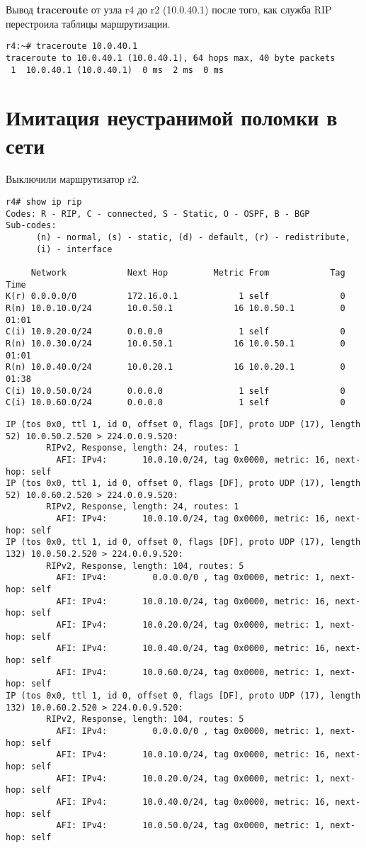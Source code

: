 \documentclass[a4paper,12pt]{article}
\begin{document}
Вывод \textbf{traceroute} от узла r4 до r2 (10.0.40.1) после того, как служба RIP перестроила таблицы маршрутизации.

\begin{Verbatim}
r4:~# traceroute 10.0.40.1
traceroute to 10.0.40.1 (10.0.40.1), 64 hops max, 40 byte packets
 1  10.0.40.1 (10.0.40.1)  0 ms  2 ms  0 ms
\end{Verbatim}

\section{Имитация неустранимой поломки в сети}

Выключили маршрутизатор r2.
\begin{Verbatim}
r4# show ip rip
Codes: R - RIP, C - connected, S - Static, O - OSPF, B - BGP
Sub-codes:
      (n) - normal, (s) - static, (d) - default, (r) - redistribute,
      (i) - interface

     Network            Next Hop         Metric From            Tag Time
K(r) 0.0.0.0/0          172.16.0.1            1 self              0
R(n) 10.0.10.0/24       10.0.50.1            16 10.0.50.1         0 01:01
C(i) 10.0.20.0/24       0.0.0.0               1 self              0
R(n) 10.0.30.0/24       10.0.50.1            16 10.0.50.1         0 01:01
R(n) 10.0.40.0/24       10.0.20.1            16 10.0.20.1         0 01:38
C(i) 10.0.50.0/24       0.0.0.0               1 self              0
C(i) 10.0.60.0/24       0.0.0.0               1 self              0
\end{Verbatim}

\begin{Verbatim}
IP (tos 0x0, ttl 1, id 0, offset 0, flags [DF], proto UDP (17), length 52) 10.0.50.2.520 > 224.0.0.9.520:
        RIPv2, Response, length: 24, routes: 1
          AFI: IPv4:       10.0.10.0/24, tag 0x0000, metric: 16, next-hop: self
IP (tos 0x0, ttl 1, id 0, offset 0, flags [DF], proto UDP (17), length 52) 10.0.60.2.520 > 224.0.0.9.520:
        RIPv2, Response, length: 24, routes: 1
          AFI: IPv4:       10.0.10.0/24, tag 0x0000, metric: 16, next-hop: self
IP (tos 0x0, ttl 1, id 0, offset 0, flags [DF], proto UDP (17), length 132) 10.0.50.2.520 > 224.0.0.9.520:
        RIPv2, Response, length: 104, routes: 5
          AFI: IPv4:         0.0.0.0/0 , tag 0x0000, metric: 1, next-hop: self
          AFI: IPv4:       10.0.10.0/24, tag 0x0000, metric: 16, next-hop: self
          AFI: IPv4:       10.0.20.0/24, tag 0x0000, metric: 1, next-hop: self
          AFI: IPv4:       10.0.40.0/24, tag 0x0000, metric: 16, next-hop: self
          AFI: IPv4:       10.0.60.0/24, tag 0x0000, metric: 1, next-hop: self
IP (tos 0x0, ttl 1, id 0, offset 0, flags [DF], proto UDP (17), length 132) 10.0.60.2.520 > 224.0.0.9.520:
        RIPv2, Response, length: 104, routes: 5
          AFI: IPv4:         0.0.0.0/0 , tag 0x0000, metric: 1, next-hop: self
          AFI: IPv4:       10.0.10.0/24, tag 0x0000, metric: 16, next-hop: self
          AFI: IPv4:       10.0.20.0/24, tag 0x0000, metric: 1, next-hop: self
          AFI: IPv4:       10.0.40.0/24, tag 0x0000, metric: 16, next-hop: self
          AFI: IPv4:       10.0.50.0/24, tag 0x0000, metric: 1, next-hop: self
\end{Verbatim}
\end{document}
